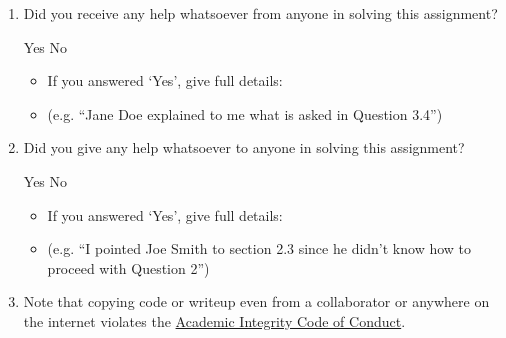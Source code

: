 \documentclass[11pt,addpoints,answers]{exam}
\begin{document}
\begin{enumerate}
    \item Did you receive any help whatsoever from anyone in solving this assignment?
    \begin{checkboxes}
     \choice Yes
     \CorrectChoice No
    \end{checkboxes}
    \begin{itemize}
        \item If you answered `Yes', give full details:
        \item (e.g. “Jane Doe explained to me what is asked in Question 3.4”)
    \end{itemize}

    \begin{tcolorbox}[fit,height=3cm,blank, borderline={1pt}{-2pt},nobeforeafter]
    \end{tcolorbox}

    \item Did you give any help whatsoever to anyone in solving this assignment?
    \begin{checkboxes}
     \choice Yes
     \CorrectChoice No\
    \end{checkboxes}
    \begin{itemize}
        \item If you answered `Yes', give full details:
        \item (e.g. “I pointed Joe Smith to section 2.3 since he didn’t know how to proceed with Question 2”)
    \end{itemize}

    \begin{tcolorbox}[fit,height=3cm,blank, borderline={1pt}{-2pt},nobeforeafter]
    \end{tcolorbox}

    \item Note that copying code or writeup even from a collaborator or anywhere on the internet violates the \href{hhttps://www.cmu.edu/policies/student-and-student-life/academic-integrity.html}{Academic Integrity Code of Conduct}.
\end{enumerate}
\end{document}
